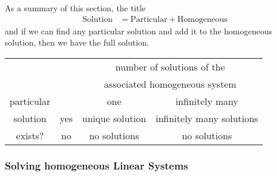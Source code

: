 As a summary of this section, the title 
%
\begin{align*}
\text{Solution} & = \text{Particular} + \text{Homogeneous} 
\end{align*}
and if we can find any particular solution and add it to the homogeneous solution, then we have the full solution.  

\begin{center}
\begin{tabular}{c|c|c|c|}
\multicolumn{1}{c}{}&\multicolumn{1}{c}{}& \multicolumn{2}{c}{number of solutions of the} \\
\multicolumn{1}{c}{}&\multicolumn{1}{c}{}& \multicolumn{2}{c}{associated homogeneous system} \\ \cline{3-4} 
\multicolumn{1}{c}{particular}&\multicolumn{1}{c|}{}& one & infinitely many \\   \cline{2-4}
solution & yes & unique solution & infinitely many solutions \\ \cline{2-4}
exists? & no & no solutions & no solutions \\ \cline{2-4}
\end{tabular} 
\end{center}

\subsubsection{Solving homogeneous Linear Systems} 


